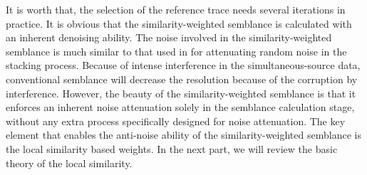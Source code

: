 
It is worth  that, the selection of the reference trace needs several iterations in practice. It is obvious that the similarity-weighted semblance is calculated with an inherent denoising ability. The noise  involved in the similarity-weighted semblance is much similar to that used in \cite{guochang2009} for attenuating random noise in the stacking process. Because of intense interference  in the simultaneous-source data, conventional semblance will decrease the resolution because of the corruption by  interference. However, the beauty of the similarity-weighted semblance is that it enforces an inherent noise attenuation solely in the semblance calculation stage, without any extra process specifically designed for noise attenuation. The key element that enables the anti-noise ability of the similarity-weighted semblance is the local similarity based weights. In the next part, we will review the basic theory of the local similarity.

